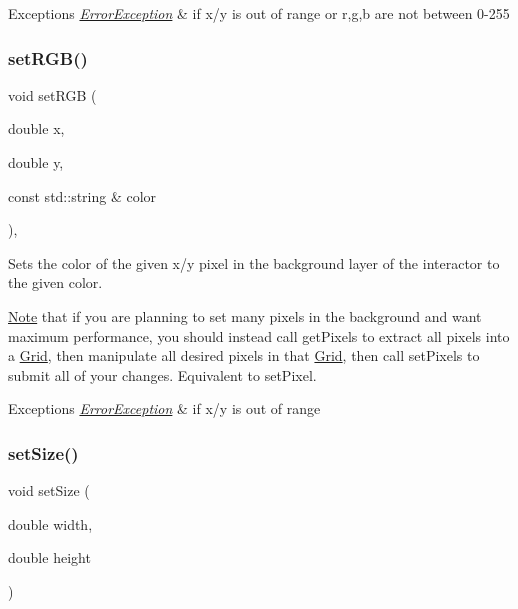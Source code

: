 \begin{DoxyExceptions}{Exceptions}
{\em \mbox{\hyperlink{classErrorException}{Error\+Exception}}} & if x/y is out of range or r,g,b are not between 0-\/255 \\
\hline
\end{DoxyExceptions}
\mbox{\label{classGDrawingSurface_ae9a228792d4bb4b628350f39eaa3ad12}} 
\subsubsection{\texorpdfstring{set\+R\+G\+B()}{setRGB()}\hspace{0.1cm}{\footnotesize\ttfamily [3/3]}}
{\footnotesize\ttfamily void set\+R\+GB (\begin{DoxyParamCaption}\item[{double}]{x,  }\item[{double}]{y,  }\item[{const std\+::string \&}]{color }\end{DoxyParamCaption})\hspace{0.3cm}{\ttfamily [virtual]}, {\ttfamily [inherited]}}



Sets the color of the given x/y pixel in the background layer of the interactor to the given color. 

\mbox{\hyperlink{classNote}{Note}} that if you are planning to set many pixels in the background and want maximum performance, you should instead call get\+Pixels to extract all pixels into a \mbox{\hyperlink{classGrid}{Grid}}, then manipulate all desired pixels in that \mbox{\hyperlink{classGrid}{Grid}}, then call set\+Pixels to submit all of your changes. Equivalent to set\+Pixel.


\begin{DoxyExceptions}{Exceptions}
{\em \mbox{\hyperlink{classErrorException}{Error\+Exception}}} & if x/y is out of range \\
\hline
\end{DoxyExceptions}
\mbox{\label{classGWindow_aca25d49481f9bf5fc8f7df4c086c4ce7}} 
\subsubsection{\texorpdfstring{set\+Size()}{setSize()}\hspace{0.1cm}{\footnotesize\ttfamily [1/2]}}
{\footnotesize\ttfamily void set\+Size (\begin{DoxyParamCaption}\item[{double}]{width,  }\item[{double}]{height }\end{DoxyParamCaption})\hspace{0.3cm}{\ttfamily [virtual]}}



